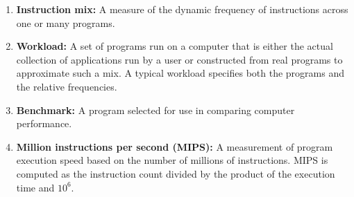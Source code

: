 \begin{enumerate}
    \item \textbf{Instruction mix:} A measure of the dynamic frequency of instructions across one or many programs.
    
    \item \textbf{Workload:} A set of programs run on a computer that is either the actual collection of applications run by a user or constructed from real programs to approximate such a mix. A typical workload specifies both the programs and the relative frequencies.
    
    \item \textbf{Benchmark:} A program selected for use in comparing computer performance.
    
    \item \textbf{Million instructions per second (MIPS):} A measurement of program execution speed based on the number of millions of instructions. MIPS is computed as the instruction count divided by the product of the execution time and $10^6$.
\end{enumerate}



